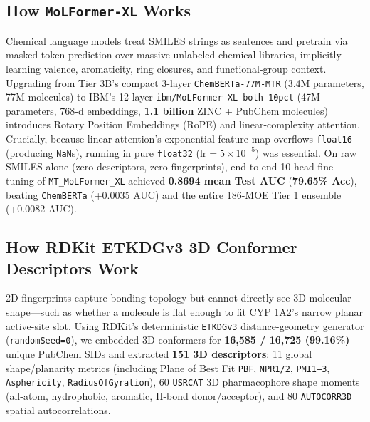\documentclass[11pt]{article}
\begin{document}
\subsection{How \texttt{MoLFormer-XL} Works}
Chemical language models treat SMILES strings as sentences and pretrain via masked-token prediction over massive unlabeled chemical libraries, implicitly learning valence, aromaticity, ring closures, and functional-group context. Upgrading from Tier 3B's compact 3-layer \texttt{ChemBERTa-77M-MTR} (3.4M parameters, 77M molecules) to IBM's 12-layer \texttt{ibm/MoLFormer-XL-both-10pct} (47M parameters, 768-d embeddings, \textbf{1.1 billion} ZINC + PubChem molecules) introduces Rotary Position Embeddings (RoPE) and linear-complexity attention. Crucially, because linear attention's exponential feature map overflows \texttt{float16} (producing \texttt{NaN}s), running in pure \texttt{float32} ($\text{lr}=5\times 10^{-5}$) was essential. On raw SMILES alone (zero descriptors, zero fingerprints), end-to-end 10-head fine-tuning of \texttt{MT\_MoLFormer\_XL} achieved \textbf{0.8694 mean Test AUC} (\textbf{79.65\% Acc}), beating \texttt{ChemBERTa} (+0.0035 AUC) and the entire 186-MOE Tier 1 ensemble (+0.0082 AUC).

\subsection{How RDKit ETKDGv3 3D Conformer Descriptors Work}
2D fingerprints capture bonding topology but cannot directly see 3D molecular shape---such as whether a molecule is flat enough to fit CYP 1A2's narrow planar active-site slot. Using RDKit's deterministic \texttt{ETKDGv3} distance-geometry generator (\texttt{randomSeed=0}), we embedded 3D conformers for \textbf{16,585 / 16,725 (99.16\%)} unique PubChem SIDs and extracted \textbf{151 3D descriptors}: 11 global shape/planarity metrics (including Plane of Best Fit \texttt{PBF}, \texttt{NPR1/2}, \texttt{PMI1--3}, \texttt{Asphericity}, \texttt{RadiusOfGyration}), 60 \texttt{USRCAT} 3D pharmacophore shape moments (all-atom, hydrophobic, aromatic, H-bond donor/acceptor), and 80 \texttt{AUTOCORR3D} spatial autocorrelations.
\end{document}
